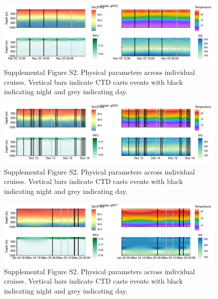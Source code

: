\documentclass[
]{article}
\begin{document}
\begin{figure}

{\centering \includegraphics[width=1\textwidth,height=\textheight]{index_files/figure-pdf/unnamed-chunk-19-6.pdf}

}

\caption{Supplemental Figure S2. Physical parameters across individual
cruises. Vertical bars indicate CTD casts events with black indicating
night and grey indicating day.}

\end{figure}

\begin{figure}

{\centering \includegraphics[width=1\textwidth,height=\textheight]{index_files/figure-pdf/unnamed-chunk-19-7.pdf}

}

\caption{Supplemental Figure S2. Physical parameters across individual
cruises. Vertical bars indicate CTD casts events with black indicating
night and grey indicating day.}

\end{figure}

\begin{figure}

{\centering \includegraphics[width=1\textwidth,height=\textheight]{index_files/figure-pdf/unnamed-chunk-19-8.pdf}

}

\caption{Supplemental Figure S2. Physical parameters across individual
cruises. Vertical bars indicate CTD casts events with black indicating
night and grey indicating day.}

\end{figure}
\end{document}

